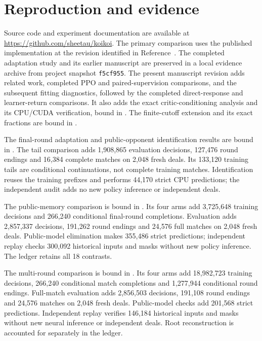 \section{Reproduction and evidence}
\label{app:reproduction}
Source code and experiment documentation are available at
\url{https://github.com/sheetau/koikoi}. The primary comparison uses the
published implementation at the revision identified in Reference~\cite{pinnedkoikoi}.
The completed adaptation
study and its earlier manuscript are preserved in a local evidence archive
from project snapshot \texttt{f5cf955}. The present manuscript revision adds
related work, completed PPO and paired-supervision comparisons, and the
subsequent fitting diagnostics, followed by the completed direct-response
and learner-return comparisons. It also adds the exact critic-conditioning
analysis and its CPU/CUDA verification, bound in
. The finite-cutoff extension
and its exact fractions are bound in
.

The final-round adaptation and public-opponent identification results are
bound in . The
tail comparison adds 1,908,865 evaluation decisions, 127,476 round endings
and 16,384 complete matches on 2,048 fresh deals. Its 133,120 training tails
are conditional continuations, not complete training matches. Identification
reuses the training prefixes and performs 44,170 strict CPU predictions;
the independent audit adds no new policy inference or independent deals.

The public-memory comparison is bound in
. Its four arms add
3,725,648 training decisions and 266,240 conditional final-round completions.
Evaluation adds 2,857,337 decisions, 191,262 round endings and 24,576 full
matches on 2,048 fresh deals. Public-model elimination makes 355,486 strict
predictions; independent replay checks 300,092 historical inputs and masks
without new policy inference. The ledger retains all 18 contrasts.

The multi-round comparison is bound in
. Its four arms
add 18,982,723 training decisions, 266,240 conditional match completions and
1,277,944 conditional round endings. Full-match evaluation adds 2,856,503
decisions, 191,108 round endings and 24,576 matches on 2,048 fresh deals.
Public-model checks add 201,568 strict predictions. Independent replay verifies
146,184 historical inputs and masks without new neural inference or independent
deals. Root reconstruction is accounted for separately in the ledger.

